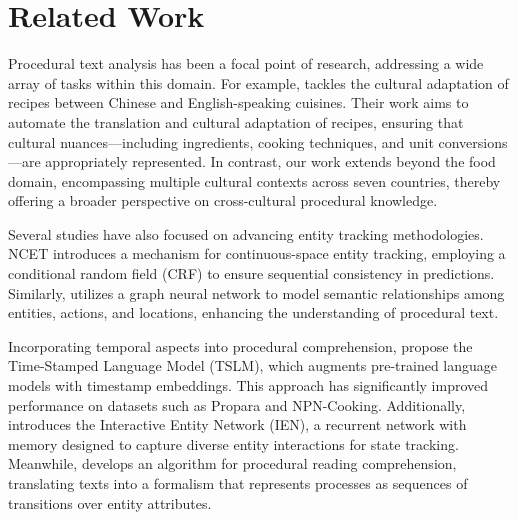 \section{Related Work}
Procedural text analysis has been a focal point of research, addressing a wide array of tasks within this domain. For example, \citet{cao2023culturaladaptationrecipes} tackles the cultural adaptation of recipes between Chinese and English-speaking cuisines. Their work aims to automate the translation and cultural adaptation of recipes, ensuring that cultural nuances—including ingredients, cooking techniques, and unit conversions—are appropriately represented. In contrast, our work extends beyond the food domain, encompassing multiple cultural contexts across seven countries, thereby offering a broader perspective on cross-cultural procedural knowledge. %

Several studies have also focused on advancing entity tracking methodologies. NCET \citep{gupta-durrett-2019-tracking} introduces a mechanism for continuous-space entity tracking, employing a conditional random field (CRF) to ensure sequential consistency in predictions. Similarly, \citet{huang-etal-2021-reasoning} utilizes a graph neural network to model semantic relationships among entities, actions, and locations, enhancing the understanding of procedural text.

Incorporating temporal aspects into procedural comprehension, \citet{rajaby-faghihi-kordjamshidi-2021-time} propose the Time-Stamped Language Model (TSLM), which augments pre-trained language models with timestamp embeddings. This approach has significantly improved performance on datasets such as Propara \cite{dalvi-etal-2018-tracking} and NPN-Cooking. Additionally, \citep{tang-etal-2020-understanding-procedural} introduces the Interactive Entity Network (IEN), a recurrent network with memory designed to capture diverse entity interactions for state tracking. Meanwhile, \citet{amini2020proceduralreadingcomprehensionattributeaware} develops an algorithm for procedural reading comprehension, translating texts into a formalism that represents processes as sequences of transitions over entity attributes.

